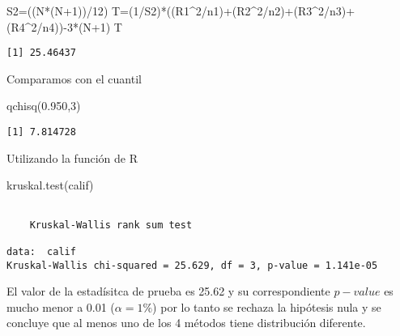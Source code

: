 \documentclass[
  a4paper,
  oneside,
  openany]{book}
\newenvironment{Shaded}{\begin{snugshade}}{\end{snugshade}}
\newcommand{\DecValTok}[1]{\textcolor[rgb]{0.00,0.00,0.81}{#1}}
\newcommand{\FloatTok}[1]{\textcolor[rgb]{0.00,0.00,0.81}{#1}}
\newcommand{\FunctionTok}[1]{\textcolor[rgb]{0.00,0.00,0.00}{#1}}
\newcommand{\NormalTok}[1]{#1}
\newcommand{\OtherTok}[1]{\textcolor[rgb]{0.56,0.35,0.01}{#1}}
\newcommand{\SpecialCharTok}[1]{\textcolor[rgb]{0.00,0.00,0.00}{#1}}
\begin{document}
\begin{Shaded}
\begin{Highlighting}[]
\NormalTok{S2}\OtherTok{=}\NormalTok{((N}\SpecialCharTok{*}\NormalTok{(N}\SpecialCharTok{+}\DecValTok{1}\NormalTok{))}\SpecialCharTok{/}\DecValTok{12}\NormalTok{)}
\NormalTok{T}\OtherTok{=}\NormalTok{(}\DecValTok{1}\SpecialCharTok{/}\NormalTok{S2)}\SpecialCharTok{*}\NormalTok{((R1}\SpecialCharTok{\^{}}\DecValTok{2}\SpecialCharTok{/}\NormalTok{n1)}\SpecialCharTok{+}\NormalTok{(R2}\SpecialCharTok{\^{}}\DecValTok{2}\SpecialCharTok{/}\NormalTok{n2)}\SpecialCharTok{+}\NormalTok{(R3}\SpecialCharTok{\^{}}\DecValTok{2}\SpecialCharTok{/}\NormalTok{n3)}\SpecialCharTok{+}\NormalTok{(R4}\SpecialCharTok{\^{}}\DecValTok{2}\SpecialCharTok{/}\NormalTok{n4))}\SpecialCharTok{{-}}\DecValTok{3}\SpecialCharTok{*}\NormalTok{(N}\SpecialCharTok{+}\DecValTok{1}\NormalTok{)}
\NormalTok{T}
\end{Highlighting}
\end{Shaded}

\begin{verbatim}
[1] 25.46437
\end{verbatim}

Comparamos con el cuantil

\begin{Shaded}
\begin{Highlighting}[]
\FunctionTok{qchisq}\NormalTok{(}\FloatTok{0.950}\NormalTok{,}\DecValTok{3}\NormalTok{)}
\end{Highlighting}
\end{Shaded}

\begin{verbatim}
[1] 7.814728
\end{verbatim}

Utilizando la función de R

\begin{Shaded}
\begin{Highlighting}[]
\FunctionTok{kruskal.test}\NormalTok{(calif)}
\end{Highlighting}
\end{Shaded}

\begin{verbatim}

    Kruskal-Wallis rank sum test

data:  calif
Kruskal-Wallis chi-squared = 25.629, df = 3, p-value = 1.141e-05
\end{verbatim}

El valor de la estadísitca de prueba es 25.62 y su correspondiente \(p-value\) es mucho menor a 0.01 (\(\alpha=1\%\)) por lo tanto se rechaza la hipótesis nula y se concluye que al menos uno de los 4 métodos tiene distribución diferente.
\end{document}
